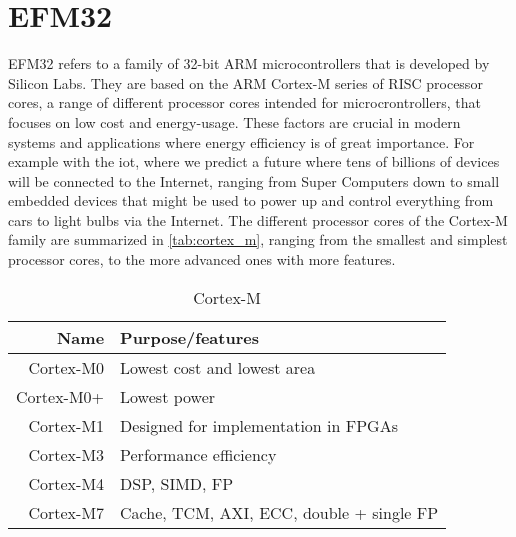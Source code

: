 
\section{EFM32}
\label{sub:emf32}

EFM32 refers to a family of 32-bit ARM microcontrollers that is developed by Silicon Labs.
They are based on the ARM Cortex-M series of RISC processor cores, a range of different processor cores intended for microcrontrollers, that focuses on low cost and energy-usage.
These factors are crucial in modern systems and applications where energy efficiency is of great importance.
For example with the \gls{iot}, where we predict a future where tens of billions of devices will be connected to the Internet, ranging from Super Computers down to small embedded devices that might be used to power up and control everything from cars to light bulbs via the Internet.
The different processor cores of the Cortex-M family are summarized in \autoref{tab:cortex_m}, ranging from the smallest and simplest processor cores, to the more advanced ones with more features.

\begin{table}
\begin{center}
\begin{tabular}{r|l}
    \textbf{Name} & \textbf{Purpose/features}            \\
    \hline
    Cortex-M0 & Lowest cost and lowest area              \\
    Cortex-M0+ & Lowest power                            \\
    Cortex-M1 & Designed for implementation in FPGAs     \\
    Cortex-M3 & Performance efficiency                   \\
    Cortex-M4 & DSP, SIMD, FP                            \\
    Cortex-M7 & Cache, TCM, AXI, ECC, double + single FP \\
    \end{tabular}
\end{center}
\caption{Cortex-M}
\label{tab:cortex_m}
\end{table}

